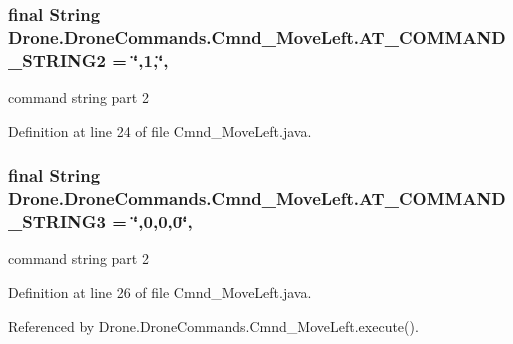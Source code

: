 \subsubsection[{A\+T\+\_\+\+C\+O\+M\+M\+A\+N\+D\+\_\+\+S\+T\+R\+I\+N\+G2}]{\setlength{\rightskip}{0pt plus 5cm}final String Drone.\+Drone\+Commands.\+Cmnd\+\_\+\+Move\+Left.\+A\+T\+\_\+\+C\+O\+M\+M\+A\+N\+D\+\_\+\+S\+T\+R\+I\+N\+G2 = \char`\"{},1,\char`\"{}\hspace{0.3cm}{\ttfamily [static]}, {\ttfamily [private]}}\label{class_drone_1_1_drone_commands_1_1_cmnd___move_left_af2d09d76648f3a83601e0d55568c0fe0}
command string part 2 

Definition at line 24 of file Cmnd\+\_\+\+Move\+Left.\+java.

\hypertarget{class_drone_1_1_drone_commands_1_1_cmnd___move_left_a9fc3bccd9f3a9ab16e9910d1a4bdabd5}{}
\subsubsection[{A\+T\+\_\+\+C\+O\+M\+M\+A\+N\+D\+\_\+\+S\+T\+R\+I\+N\+G3}]{\setlength{\rightskip}{0pt plus 5cm}final String Drone.\+Drone\+Commands.\+Cmnd\+\_\+\+Move\+Left.\+A\+T\+\_\+\+C\+O\+M\+M\+A\+N\+D\+\_\+\+S\+T\+R\+I\+N\+G3 = \char`\"{},0,0,0\char`\"{}\hspace{0.3cm}{\ttfamily [static]}, {\ttfamily [private]}}\label{class_drone_1_1_drone_commands_1_1_cmnd___move_left_a9fc3bccd9f3a9ab16e9910d1a4bdabd5}
command string part 2 

Definition at line 26 of file Cmnd\+\_\+\+Move\+Left.\+java.



Referenced by Drone.\+Drone\+Commands.\+Cmnd\+\_\+\+Move\+Left.\+execute().

\hypertarget{class_drone_1_1_drone_commands_1_1_cmnd___move_left_a2492b3f8b7d40f172fcde81705d96547}{}
